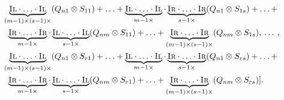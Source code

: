 \begin{align*}
      & \hspace{10pt}\underbrace{\textsc{Il} \cdot \ldots \cdot \textsc{Il}}_{(m-1) \times ( s-1) \times} (Q_{n1} \otimes S_{11}) + \ldots + \underbrace{\textsc{Il} \cdot \ldots \cdot \textsc{Il}}_{m-1 \times}\cdot \underbrace{\textsc{Ir} \cdot \ldots \cdot \textsc{Ir}}_{s-1  \times}  (Q_{n1} \otimes S_{1s})  + \ldots + \\
     & \hspace{15pt} \underbrace{\textsc{Ir} \cdot \ldots \cdot \textsc{Ir}}_{m-1  \times}  \cdot  \underbrace{\textsc{Il} \cdot \ldots \cdot \textsc{Il}}_{s-1 \times} (Q_{nm} \otimes S_{11})+ \ldots + \underbrace{\textsc{Ir} \cdot \ldots \cdot \textsc{Ir}}_{(m-1) \times (s-1) \times}(Q_{nm} \otimes S_{1s}), \hspace{2pt} \ldots \hspace{2pt},  \\
      & \hspace{10pt}\underbrace{\textsc{Il} \cdot \ldots \cdot \textsc{Il}}_{(m-1) \times ( s-1) \times} (Q_{n1} \otimes S_{r1}) + \ldots + \underbrace{\textsc{Il} \cdot \ldots \cdot \textsc{Il}}_{m-1 \times}\cdot \underbrace{\textsc{Ir} \cdot \ldots \cdot \textsc{Ir}}_{s-1  \times}  (Q_{n1} \otimes S_{rs})  + \ldots + \\
      & \hspace{15pt} \underbrace{\textsc{Ir} \cdot \ldots \cdot \textsc{Ir}}_{m-1  \times}  \cdot  \underbrace{\textsc{Il} \cdot \ldots \cdot \textsc{Il}}_{s-1 \times} (Q_{nm} \otimes S_{r1})+ \ldots + \underbrace{\textsc{Ir} \cdot \ldots \cdot \textsc{Ir}}_{(m-1) \times (s-1) \times}(Q_{nm} \otimes S_{rs})].
\end{align*}

